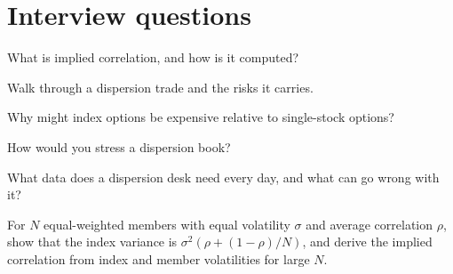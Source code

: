 \section{Interview questions}

\begin{interviewq}\label{iq:s2:dispersion-and-correlation:1}
What is implied correlation, and how is it computed?
\end{interviewq}

\begin{interviewq}\label{iq:s2:dispersion-and-correlation:2}
Walk through a dispersion trade and the risks it carries.
\end{interviewq}

\begin{interviewq}\label{iq:s2:dispersion-and-correlation:3}
Why might index options be expensive relative to single-stock options?
\end{interviewq}

\begin{interviewq}\label{iq:s2:dispersion-and-correlation:4}
How would you stress a dispersion book?
\end{interviewq}

\begin{interviewq}\label{iq:s2:dispersion-and-correlation:5}
What data does a dispersion desk need every day, and what can go wrong with it?
\end{interviewq}

\begin{interviewq}\label{iq:s2:dispersion-and-correlation:6}
For $N$ equal-weighted members with equal volatility $\sigma$ and average correlation $\rho$, show that the index variance is $\sigma^2(\rho + (1 -
\rho)/N)$, and derive the implied correlation from index and member volatilities for large $N$.
\end{interviewq}
